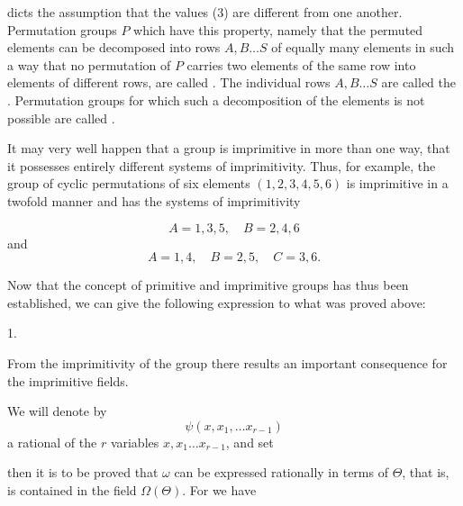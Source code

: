 dicts the assumption that the values (3) are different from one another. Permutation
groups $P$ which have this property, namely that the permuted
elements can be decomposed into rows $A, B \dots S$ of equally
many elements in such a way that no permutation of $P$ carries
two elements of the same row into elements of different rows,
are called . The individual rows
$A, B \dots S$ are called the .
Permutation groups for which such a decomposition of the elements
is not possible are called .

It may very well happen that a group is imprimitive in more
than one way, that it possesses entirely different systems of
imprimitivity. Thus, for example, the group of cyclic permutations
of six elements $(1, 2, 3, 4, 5, 6)$ is imprimitive in a twofold
manner and has the systems of imprimitivity

\[
A = 1, 3, 5, \quad B = 2, 4, 6
\]
and
\[
A = 1, 4, \quad B = 2, 5, \quad C = 3, 6.
\]

Now that the concept of primitive and imprimitive groups has
thus been established, we can give the following expression to
what was proved above:

1. 

From the imprimitivity of the group there results an important
consequence for the imprimitive fields.

We will denote by
\[
\psi(x, x_1, \dots x_{r-1})
\]
a rational  of the $r$ variables
$x, x_1 \dots x_{r-1}$, and set

then it is to be proved that $\omega$ can be expressed rationally
in terms of $\Theta$, that is, is contained in the field $\Omega(\Theta)$. For
we have

